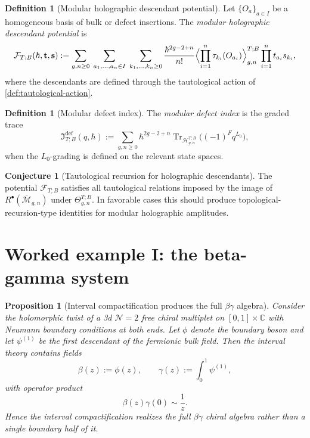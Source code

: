\documentclass[11pt]{article}
\newtheorem{proposition}[theorem]{Proposition}
\theoremstyle{definition}
\newtheorem{definition}[theorem]{Definition}
\newtheorem{conjecture}[theorem]{Conjecture}
\theoremstyle{remark}
\newcommand{\F}{\mathcal F}
\newcommand{\Hh}{\mathcal H}
\newcommand{\M}{\mathcal M}
\newcommand{\Tr}{\operatorname{Tr}}
\newcommand{\defect}{\mathrm{def}}
\newcommand{\bbeta}{\beta}
\newcommand{\bgamma}{\gamma}
\begin{document}
\begin{definition}[Modular holographic descendant potential]\label{def:descendant-potential}
Let $\{O_a\}_{a\in I}$ be a homogeneous basis of bulk or defect insertions. The \emph{modular holographic descendant potential} is
\[
\F_{T;B}(\hbar,\mathbf t,\mathbf s)
:=
\sum_{g,n\ge 0}\;
\sum_{a_1,\dots,a_n\in I}\;
\sum_{k_1,\dots,k_n\ge 0}
\frac{\hbar^{2g-2+n}}{n!}
\Bigl\langle \prod_{i=1}^n \tau_{k_i}(O_{a_i})\Bigr\rangle^{T;B}_{g,n}
\prod_{i=1}^n t_{a_i}s_{k_i},
\]
where the descendants are defined through the tautological action of \cref{def:tautological-action}.
\end{definition}

\begin{definition}[Modular defect index]\label{def:defect-index}
The \emph{modular defect index} is the graded trace
\[
\mathfrak I^{\defect}_{T;B}(q,\hbar)
:=
\sum_{g,n\ge 0}
\hbar^{2g-2+n}
\Tr_{\Hh_{g,n}^{T;B}}
\bigl((-1)^F q^{L_0}\bigr),
\]
when the $L_0$-grading is defined on the relevant state spaces.
\end{definition}

\begin{conjecture}[Tautological recursion for holographic descendants]\label{conj:tautological-recursion}
The potential $\F_{T;B}$ satisfies all tautological relations imposed by the image of $R^\bullet(\overline{\M}_{g,n})$ under $\Theta^{T;B}_{g,n}$. In favorable cases this should produce topological-recursion-type identities for modular holographic amplitudes.
\end{conjecture}

\section{Worked example I: the beta-gamma system}\label{sec:beta-gamma}

\begin{proposition}[Interval compactification produces the full $\bbeta\bgamma$ algebra]\label{prop:beta-gamma-interval}
Consider the holomorphic twist of a 3d $\mathcal N=2$ free chiral multiplet on $[0,1]\times \mathbb C$ with Neumann boundary conditions at both ends. Let $\phi$ denote the boundary boson and let $\psi^{(1)}$ be the first descendant of the fermionic bulk field. Then the interval theory contains fields
\[
\bbeta(z):=\phi(z),
\qquad
\bgamma(z):=\int_0^1 \psi^{(1)},
\]
with operator product
\[
\bbeta(z)\bgamma(0)\sim \frac{1}{z}.
\]
Hence the interval compactification realizes the full $\bbeta\bgamma$ chiral algebra rather than a single boundary half of it.
\end{proposition}
\end{document}
